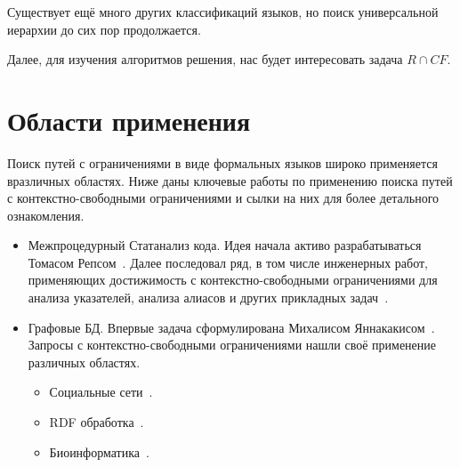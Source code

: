Существует ещё много других классификаций языков, но поиск универсальной иерархии до сих пор продолжается.

Далее, для изучения алгоритмов решения, нас будет интересовать задача $R \cap CF$.

\section{Области применения}

Поиск путей с ограничениями в виде формальных языков широко применяется вразличных областях. Ниже даны ключевые работы по применению поиска путей с контекстно-свободными ограничениями и сылки на них для более детального ознакомления.

\begin{itemize}
    \item Межпроцедурный Статанализ кода. 
    Идея начала активо разрабатываться Томасом Репсом~\cite{Reps}. Далее последовал ряд, в том числе инженерных работ, применяющих достижимость с контекстно-свободными ограничениями для анализа указателей, анализа алиасов и других прикладных задач~\cite{LabelFlowCFLReachability,specificationCFLReachability,Zheng}.    
    \item Графовые БД. Впервые задача сформулирована Михалисом Яннакакисом~\cite{Yannakakis}. Запросы с контекстно-свободными ограничениями нашли своё применение различных областях.
    \begin{itemize}
        \item Социальные сети~\cite{Hellings2015PathRF}.
        \item RDF обработка~\cite{10.1007/978-3-319-46523-4_38}.
        \item Биоинформатика~\cite{cfpqBio}.    
    \end{itemize}
    
\end{itemize}




